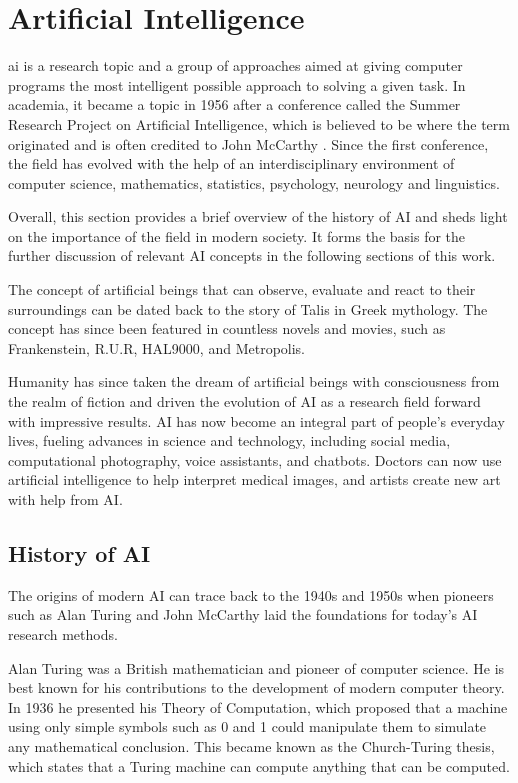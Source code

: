 \label{sec:2_background_theory}


\section{Artificial Intelligence}

\gls{ai} is a research topic and a group of approaches aimed at giving computer programs the most intelligent possible approach to solving a given task. In academia, it became a topic in 1956 after a conference called the Summer Research Project on Artificial Intelligence, which is believed to be where the term originated and is often credited to John McCarthy \cite{mccarthyProposalDartmouthSummer2006, andresenJohnMcCarthyFather2002}. Since the first conference, the field has evolved with the help of an interdisciplinary environment of computer science, mathematics, statistics, psychology, neurology and linguistics.

Overall, this section provides a brief overview of the history of AI and sheds light on the importance of the field in modern society. It forms the basis for the further discussion of relevant AI concepts in the following sections of this work.

The concept of artificial beings that can observe, evaluate and react to their surroundings can be dated back to the story of Talis in Greek mythology. The concept has since been featured in countless novels and movies, such as Frankenstein, R.U.R, HAL9000, and Metropolis. 

Humanity has since taken the dream of artificial beings with consciousness from the realm of fiction and driven the evolution of AI as a research field forward with impressive results. 
AI has now become an integral part of people's everyday lives, fueling advances in science and technology, including social media, computational photography, voice assistants, and chatbots. Doctors can now use artificial intelligence to help interpret medical images, and artists create new art with help from AI.


\subsection{History of AI}
The origins of modern AI can trace back to the 1940s and 1950s when pioneers such as Alan Turing and John McCarthy laid the foundations for today's AI research methods. 

Alan Turing was a British mathematician and pioneer of computer science. He is best known for his contributions to the development of modern computer theory. In 1936 he presented his Theory of Computation, which proposed that a machine using only simple symbols such as 0 and 1 could manipulate them to simulate any mathematical conclusion. This became known as the Church-Turing thesis, which states that a Turing machine can compute anything that can be computed. 

